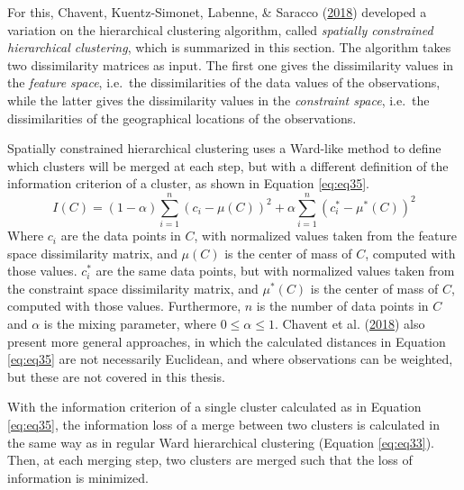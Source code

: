 \documentclass[12pt,oneside]{reedthesis}
\begin{document}
For this, Chavent, Kuentz-Simonet, Labenne, \& Saracco
(\protect\hyperlink{ref-clustgeo}{2018}) developed a variation on the
hierarchical clustering algorithm, called \emph{spatially constrained
hierarchical clustering}, which is summarized in this section. The
algorithm takes two dissimilarity matrices as input. The first one gives
the dissimilarity values in the \emph{feature space}, i.e.~the
dissimilarities of the data values of the observations, while the latter
gives the dissimilarity values in the \emph{constraint space}, i.e.~the
dissimilarities of the geographical locations of the observations.

Spatially constrained hierarchical clustering uses a Ward-like method to
define which clusters will be merged at each step, but with a different
definition of the information criterion of a cluster, as shown in
Equation \eqref{eq:eq35}.
\begin{equation} 
I(C) = 
(1-\alpha)\sum_{i=1}^{n}(c_{i} - \mu(C))^{2} +
\alpha\sum_{i=1}^{n}(c_{i}^{*} - \mu^{*}(C))^{2}
\label{eq:eq35}
\end{equation}
Where \(c_{i}\) are the data points in \(C\), with normalized values
taken from the feature space dissimilarity matrix, and \(\mu(C)\) is the
center of mass of \(C\), computed with those values. \(c_{i}^{*}\) are
the same data points, but with normalized values taken from the
constraint space dissimilarity matrix, and \(\mu^{*}(C)\) is the center
of mass of \(C\), computed with those values. Furthermore, \(n\) is the
number of data points in \(C\) and \(\alpha\) is the mixing parameter,
where \(0 \leq \alpha \leq 1\). Chavent et al.
(\protect\hyperlink{ref-clustgeo}{2018}) also present more general
approaches, in which the calculated distances in Equation \eqref{eq:eq35}
are not necessarily Euclidean, and where observations can be weighted,
but these are not covered in this thesis.

With the information criterion of a single cluster calculated as in
Equation \eqref{eq:eq35}, the information loss of a merge between two
clusters is calculated in the same way as in regular Ward hierarchical
clustering (Equation \eqref{eq:eq33}). Then, at each merging step, two
clusters are merged such that the loss of information is minimized.
\end{document}
